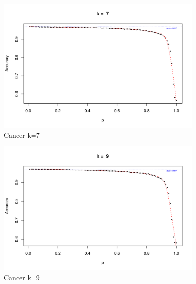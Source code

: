 \documentclass{article}
\begin{document}
\begin{figure}
 \centering
 \includegraphics[width=0.9\textwidth]{./figures/Cancer_k7.pdf}
 \caption{Cancer k=7}
 \label{fig:Cancer7}
\end{figure}
\begin{figure}
 \centering
 \includegraphics[width=0.9\textwidth]{./figures/Cancer_k9.pdf}
 \caption{Cancer k=9}
 \label{fig:Cancer9}
\end{figure}
\end{document}

